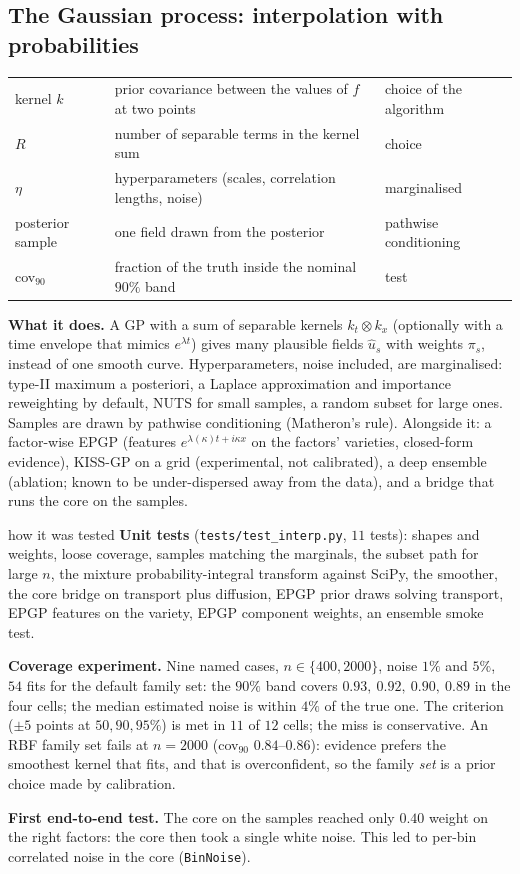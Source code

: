 \subsection{The Gaussian process: interpolation with probabilities}\label{sec:gp}
\begin{symbols}
\begin{tabular}{@{}L{2.6cm}L{6.0cm}L{4.3cm}@{}}
kernel $k$ & prior covariance between the values of $f$ at two points & choice of the algorithm\\
$R$ & number of separable terms in the kernel sum & choice\\
$\eta$ & hyperparameters (scales, correlation lengths, noise) & marginalised\\
posterior sample & one field drawn from the posterior & pathwise conditioning\\
cov$_{90}$ & fraction of the truth inside the nominal $90\%$ band & test\\
\end{tabular}
\end{symbols}
\textbf{What it does.} A GP with a sum of separable kernels $k_t\otimes k_x$ (optionally with a time envelope that mimics $e^{\lambda t}$) gives many plausible fields $\hat u_s$ with weights $\pi_s$, instead of one smooth curve. Hyperparameters, noise included, are marginalised: type-II maximum a posteriori, a Laplace approximation and importance reweighting by default, NUTS for small samples, a random subset for large ones. Samples are drawn by pathwise conditioning (Matheron's rule). Alongside it: a factor-wise EPGP (features $e^{\lambda(\kappa)t+i\kappa x}$ on the factors' varieties, closed-form evidence), KISS-GP on a grid (experimental, not calibrated), a deep ensemble (ablation; known to be under-dispersed away from the data), and a bridge that runs the core on the samples.

\begin{explained}{how it was tested}
\textbf{Unit tests} (\texttt{tests/test\_interp.py}, $11$ tests): shapes and weights, loose coverage, samples matching the marginals, the subset path for large $n$, the mixture probability-integral transform against SciPy, the smoother, the core bridge on transport plus diffusion, EPGP prior draws solving transport, EPGP features on the variety, EPGP component weights, an ensemble smoke test.

\medskip\textbf{Coverage experiment.} Nine named cases, $n\in\{400,2000\}$, noise $1\%$ and $5\%$, $54$ fits for the default family set: the $90\%$ band covers $0.93,\ 0.92,\ 0.90,\ 0.89$ in the four cells; the median estimated noise is within $4\%$ of the true one. The criterion ($\pm5$ points at $50,90,95\%$) is met in $11$ of $12$ cells; the miss is conservative. An RBF family set fails at $n=2000$ (cov$_{90}$ $0.84$--$0.86$): evidence prefers the smoothest kernel that fits, and that is overconfident, so the family \emph{set} is a prior choice made by calibration.

\medskip\textbf{First end-to-end test.} The core on the samples reached only $0.40$ weight on the right factors: the core then took a single white noise. This led to per-bin correlated noise in the core (\texttt{BinNoise}).
\end{explained}

